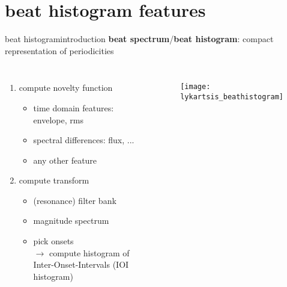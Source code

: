         \section[beat histogram]{beat histogram features}
            \begin{frame}{beat histogram}{introduction}
                \vspace{-3mm}
                \textbf{beat spectrum}/\textbf{beat histogram}: compact representation of periodicities
                \begin{columns}[T]
                        \begin{enumerate}
                            \item<1->   compute novelty function
                                \begin{itemize}
                                    \item   time domain features: envelope, rms
                                    \item   spectral differences: flux, ...
                                    \item   any other feature
                                \end{itemize}
                            \item<1->   compute transform
                                \begin{itemize}
                                    \item   (resonance) filter bank
                                    \item   magnitude spectrum
                                    \item   pick onsets\\ $\rightarrow$ compute histogram of Inter-Onset-Intervals (IOI histogram)
                                \end{itemize}
                        \end{enumerate}
                        \begin{figure}
                            \centering
                                \texttt{[image: lykartsis\_beathistogram]}
                        \end{figure}
                \end{columns}
                
            \end{frame}
